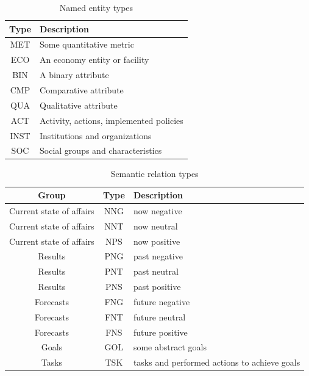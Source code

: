 \documentclass{dialogue}
\begin{document}
\begin{table}[bth]
	\centering
	\small
	\begin{tabular}{c||p{8cm}}
		\hline
		Type & Description\\ \hline
		MET & Some quantitative metric \\ \hline
		ECO & An economy entity or facility\\ \hline
		BIN & A binary attribute\\ \hline
		CMP & Comparative attribute\\ \hline
		QUA & Qualitative attribute\\ \hline
		ACT & Activity, actions, implemented policies\\ \hline
		INST & Institutions and organizations\\ \hline
		SOC & Social groups and characteristics\\ \hline
	\end{tabular}
	\caption{Named entity types}
	\label{tab:ner}
\end{table}
\begin{table}[bth]
	\centering
	\small
	\begin{tabular}{c|c|p{8cm}}
		\hline
		Group & Type & Description\\ \hline
		Current state of affairs & NNG & now negative \\ \hline
		Current state of affairs & NNT & now neutral \\ \hline
		Current state of affairs & NPS & now positive \\ \hline\hline

		Results & PNG & past negative\\ \hline
		Results & PNT & past neutral\\ \hline
		Results & PNS & past positive\\ \hline\hline

		Forecasts & FNG & future negative\\ \hline
		Forecasts & FNT & future neutral\\ \hline
		Forecasts & FNS & future positive\\ \hline\hline

		Goals & GOL & some abstract goals\\ \hline
		Tasks & TSK & tasks and performed actions to achieve goals\\ \hline

	\end{tabular}
	\caption{Semantic relation types}
	\label{tab:rel}
\end{table}
\end{document}
